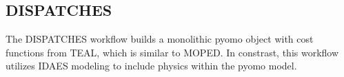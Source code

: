 \subsection{DISPATCHES}
The DISPATCHES workflow builds a monolithic pyomo object with cost functions from TEAL, which is similar to MOPED. In constrast, this workflow utilizes IDAES modeling to include physics within the pyomo model.

